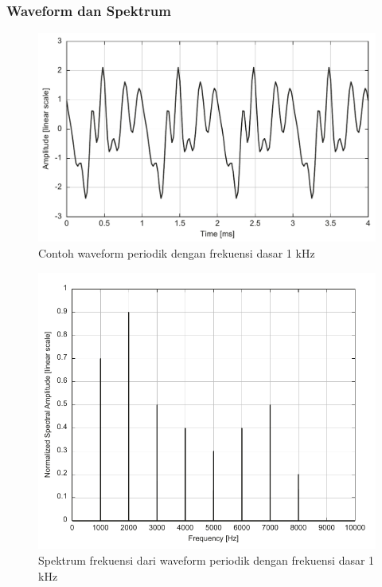 \documentclass[pdflatex,compress]{beamer}
\begin{document}
\begin{frame}
	\frametitle{Waveform dan Spektrum}
	\begin{multicols}{2}
		\begin{figure}
			\centering
			\includegraphics[width=\linewidth]{img/img006}
			\caption{Contoh waveform periodik dengan frekuensi dasar 1 kHz}
			\label{fig:img006}
		\end{figure}
		\columnbreak
		\begin{figure}
			\centering
			\includegraphics[width=\linewidth]{img/img007}
			\caption{Spektrum frekuensi dari waveform periodik dengan frekuensi dasar 1 kHz}
			\label{fig:img007}
		\end{figure}
	\end{multicols}
\end{frame}
\end{document}
